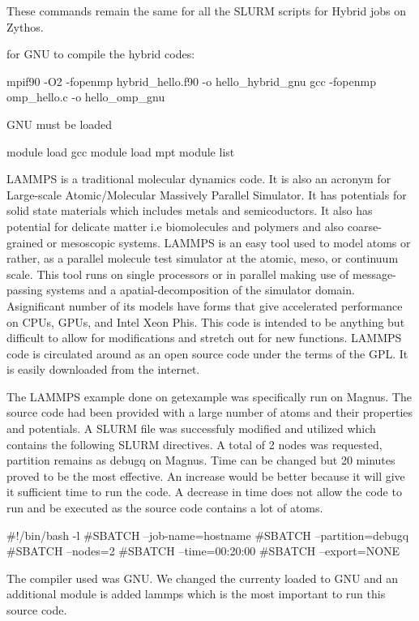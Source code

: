 \begin{Document}
These commands remain the same for all the SLURM scripts for Hybrid jobs on Zythos.

for GNU to compile the hybrid codes:

mpif90 -O2 -fopenmp hybrid_hello.f90 -o hello_hybrid_gnu
gcc -fopenmp omp_hello.c -o hello_omp_gnu

GNU must be loaded
 
module load gcc
module load mpt
module list



LAMMPS is a traditional molecular dynamics code. It is also an acronym for Large-scale Atomic/Molecular Massively Parallel Simulator.
It has potentials for solid state materials which includes metals and semicoductors. It also has potential for delicate matter i.e biomolecules and polymers and also coarse-grained or mesoscopic systems.
LAMMPS is an easy tool used to model atoms or rather, as a parallel molecule test simulator at the atomic, meso, or continuum scale.
This tool runs on single processors or in parallel making use of message-passing systems and a apatial-decomposition of the simulator domain.
Asignificant number of its models have forms that give accelerated performance on CPUs, GPUs, and Intel Xeon Phis.
This code is intended to be anything but difficult to allow for modifications and stretch out for new functions.
LAMMPS code is circulated around as an open source code under the terms of the GPL. It is easily downloaded from the internet.

The LAMMPS example done on getexample was specifically run on Magnus.
The source code had been provided with a large number of atoms and their properties and potentials.
A SLURM file was successfuly modified and utilized which contains the following SLURM directives.
A total of 2 nodes was requested, partition remains as debugq on Magnus. 
Time can be changed but 20 minutes proved to be the most effective. 
An increase would be better because it will give it sufficient time to run the code. 
A decrease in time does not allow the code to run and be executed as the source code contains a lot of atoms.

#!/bin/bash -l
#SBATCH --job-name=hostname
#SBATCH --partition=debugq
#SBATCH --nodes=2
#SBATCH --time=00:20:00
#SBATCH --export=NONE

The compiler used was GNU. We changed the currenty loaded to GNU and an additional module is added lammps which is the most important to run this source code.


\end{Document}
